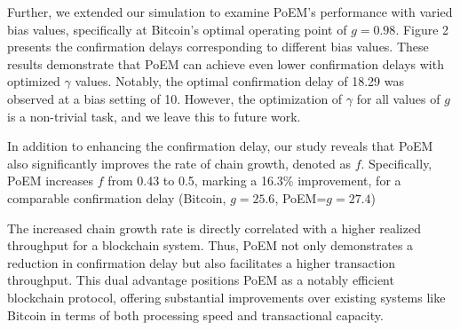 Further, we extended our simulation to examine PoEM's performance with varied
bias values, specifically at Bitcoin's optimal operating point of $g=0.98$.
Figure 2 presents the confirmation delays corresponding to different bias
values. These results demonstrate that PoEM can achieve even lower confirmation
delays with optimized $\gamma$ values. Notably, the optimal confirmation delay
of 18.29 was observed at a bias setting of 10. However, the optimization of
$\gamma$ for all values of $g$ is a non-trivial task, and we leave this to
future work.

In addition to enhancing the confirmation delay, our study reveals that PoEM
also significantly improves the rate of chain growth, denoted as $f$.
Specifically, PoEM increases $f$ from 0.43 to 0.5, marking a 16.3\%
improvement, for a comparable confirmation delay (Bitcoin, $g=25.6$,
PoEM=$g=27.4$)

The increased chain growth rate is directly correlated with a higher realized
throughput for a blockchain system. Thus, PoEM not only demonstrates a
reduction in confirmation delay but also facilitates a higher transaction
throughput. This dual advantage positions PoEM as a notably efficient
blockchain protocol, offering substantial improvements over existing systems
like Bitcoin in terms of both processing speed and transactional capacity.


